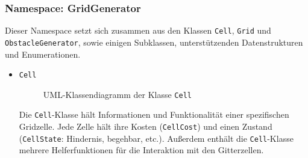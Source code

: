 \subsubsection{Namespace: GridGenerator}
\label{subsubsec:aufbau_backend_ueberblick_gridgen}
Dieser Namespace setzt sich zusammen aus den Klassen \texttt{Cell}, \texttt{Grid} und \texttt{Obstacle\-Generator}, sowie einigen Subklassen, unterstützenden Datenstrukturen und Enumerationen.
\begin{itemize}
    \item \texttt{Cell} \\
    \begin{figure}[H]
        \vspace{-0.5cm}
        \centering
        
        \caption{UML-Klassendiagramm der Klasse \texttt{Cell}}
        \label{fig:uml_cell}
    \end{figure}
    Die \texttt{Cell}-Klasse hält Informationen und Funktionalität einer spezifischen Gridzelle.
    Jede Zelle hält ihre Kosten (\texttt{CellCost}) und einen Zustand (\texttt{Cell\-State}: Hindernis, begehbar, etc.).
    Außerdem enthält die \texttt{Cell}-Klasse mehrere Helferfunktionen für die Interaktion mit den Gitterzellen.


\end{itemize}
